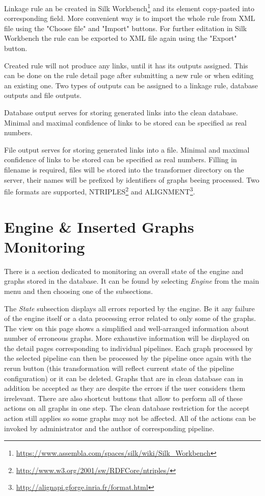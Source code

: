 Linkage rule an be created in Silk Workbench\footnote{\url{https://www.assembla.com/spaces/silk/wiki/Silk\_Workbench}} and its  element copy-pasted into corresponding field. More convenient way is to import the whole rule from XML file using the "Choose file" and "Import" buttons. For further editation in Silk Workbench the rule can be exported to XML file again using the "Export" button.

Created rule will not produce any links, until it has its outputs assigned. This can be done on the rule detail page after submitting a new rule or when editing an existing one. Two types of outputs can be assigned to a linkage rule, database outputs and file outputs.

Database output serves for storing generated links into the clean database. Minimal and maximal confidence of links to be stored can be specified as real numbers.

File output serves for storing generated links into a file. Minimal and maximal confidence of links to be stored can be specified as real numbers. Filling in filename is required, files will be stored into the transformer directory on the server, their names will be prefixed by identifiers of graphs beeing processed. Two file formats are supported, NTRIPLES\footnote{\url{http://www.w3.org/2001/sw/RDFCore/ntriples/}} and ALIGNMENT\footnote{\url{http://alignapi.gforge.inria.fr/format.html}}. 

\section{Engine \& Inserted Graphs Monitoring}
\label{sec:engineState}

There is a section dedicated to monitoring an overall state of the engine and graphs stored in the database. It can be found by selecting \emph{Engine} from the main menu and then choosing one of the subsections.

The \emph{State} subsection displays all errors reported by the engine. Be it any failure of the engine itself or a data processing error related to only some of the graphs. The view on this page shows a simplified and well-arranged information about number of erroneous graphs. More exhaustive information will be displayed on the detail pages corresponding to individual pipelines. Each graph processed by the selected pipeline can then be processed by the pipeline once again with the rerun button (this transformation will reflect current state of the pipeline configuration) or it can be deleted. Graphs that are in clean database can in addition be accepted as they are despite the errors if the user considers them irrelevant. There are also shortcut buttons that allow to perform all of these actions on all graphs in one step. The clean database restriction for the accept action still applies so some graphs may not be affected. All of the actions can be invoked by administrator and the author of corresponding pipeline.

